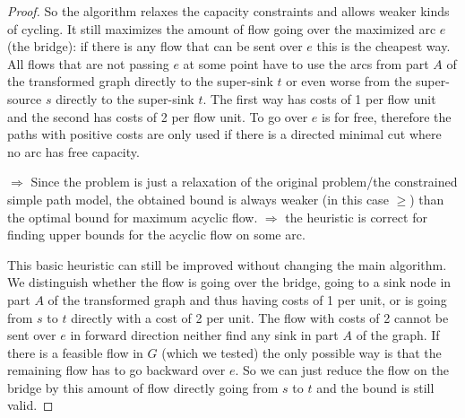 \begin{proof}
So the algorithm relaxes the capacity constraints and allows weaker kinds of cycling. It still maximizes the amount of 
flow going over the maximized arc $e$ (the bridge): if there is any flow that can be sent over $e$ this is the cheapest 
way. All flows that are not passing $e$ at some point have to use the arcs from part $A$ of the transformed graph 
directly to the super-sink $t$ or even worse from the super-source $s$ directly to the super-sink $t$. The first way 
has costs of 1 per flow unit and the second has costs of 2 per flow unit. To go over $e$ is for free, therefore the 
paths with positive costs are only used if there is a directed minimal cut where no arc has free capacity.


$\Rightarrow$ Since the problem is just a relaxation of the original problem/the  constrained simple path model, the 
obtained bound is always weaker (in this case $\ge$) than the optimal bound for maximum acyclic flow. 
$\Rightarrow$ the heuristic is correct for finding upper bounds for the acyclic flow on some arc.


This basic heuristic can still be improved without changing the main algorithm. We distinguish whether the flow is 
going over the bridge, going to a sink node in part $A$ of the transformed graph and thus having costs of 1 per unit, 
or is going from $s$ to $t$ directly with a cost of 2 per unit. The flow with costs of 2 cannot be sent over $e$ in 
forward direction neither find any sink in part $A$ of the graph. If there is a feasible flow in $G$ (which we tested) 
the only possible way is that the remaining flow has to go backward over $e$. So we can just reduce the flow on the 
bridge by this amount of flow directly going from $s$ to $t$ and the bound is still valid.
\end{proof}

